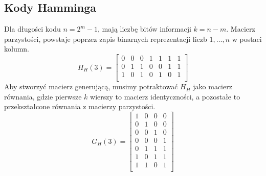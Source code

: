 \documentclass{../notatki}
\begin{document}
\begin{multicols}{2}
  \section{Kody Hamminga}

  Dla długości kodu $n = 2^m - 1$, mają liczbę bitów informacji $k = n - m$.
  Macierz parzystości, powstaje poprzez zapis binarnych reprezentacji liczb
  $1, \dots, n$ w postaci kolumn.
  $$
  H_H(3) =
  \begin{bmatrix}
    0 & 0 & 0 & 1 & 1 & 1 & 1 \\
    0 & 1 & 1 & 0 & 0 & 1 & 1 \\
    1 & 0 & 1 & 0 & 1 & 0 & 1 \\
  \end{bmatrix}
  $$
  Aby stworzyć macierz generującą, musimy potraktować $H_H$ jako
  macierz równania, gdzie pierwsze $k$ wierszy to macierz identyczności,
  a pozostałe to przekształcone równania z macierzy parzystości.
  $$
  G_H(3) =
  \begin{bmatrix}
    1 & 0 & 0 & 0 \\
    0 & 1 & 0 & 0 \\
    0 & 0 & 1 & 0 \\
    0 & 0 & 0 & 1 \\
    0 & 1 & 1 & 1 \\
    1 & 0 & 1 & 1 \\
    1 & 1 & 0 & 1 \\
  \end{bmatrix}
  $$

\end{multicols}
\end{document}
